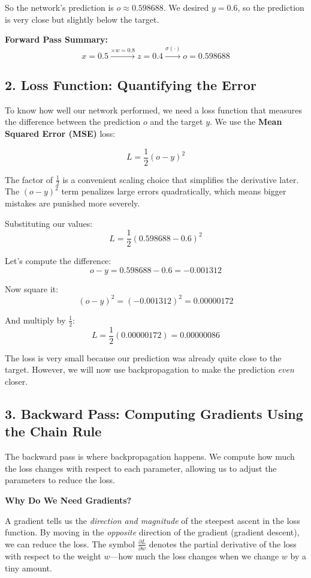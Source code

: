 \documentclass[12pt]{article}
\begin{document}
So the network's prediction is $o \approx 0.598688$. We desired $y = 0.6$, so the prediction is very close but slightly below the target.

\vspace{0.3cm}

\noindent\textbf{Forward Pass Summary:}
\[
\boxed{x = 0.5 \xrightarrow{\times w=0.8} z = 0.4 \xrightarrow{\sigma(\cdot)} o = 0.598688}
\]

\subsection*{2. Loss Function: Quantifying the Error}

To know how well our network performed, we need a loss function that measures the difference between the prediction $o$ and the target $y$. We use the \textbf{Mean Squared Error (MSE)} loss:

\[
L = \frac{1}{2}(o - y)^2
\]

The factor of $\frac{1}{2}$ is a convenient scaling choice that simplifies the derivative later. The $(o - y)^2$ term penalizes large errors quadratically, which means bigger mistakes are punished more severely.

Substituting our values:
\[
L = \frac{1}{2}(0.598688 - 0.6)^2
\]

Let's compute the difference:
\[
o - y = 0.598688 - 0.6 = -0.001312
\]

Now square it:
\[
(o - y)^2 = (-0.001312)^2 = 0.00000172
\]

And multiply by $\frac{1}{2}$:
\[
L = \frac{1}{2}(0.00000172) = 0.00000086
\]

The loss is very small because our prediction was already quite close to the target. However, we will now use backpropagation to make the prediction \textit{even} closer.

\subsection*{3. Backward Pass: Computing Gradients Using the Chain Rule}

The backward pass is where backpropagation happens. We compute how much the loss changes with respect to each parameter, allowing us to adjust the parameters to reduce the loss.

\vspace{0.2cm}

\noindent\textbf{Why Do We Need Gradients?}

A gradient tells us the \textit{direction and magnitude} of the steepest ascent in the loss function. By moving in the \textit{opposite} direction of the gradient (gradient descent), we can reduce the loss. The symbol $\frac{\partial L}{\partial w}$ denotes the partial derivative of the loss with respect to the weight $w$—how much the loss changes when we change $w$ by a tiny amount.
\end{document}
